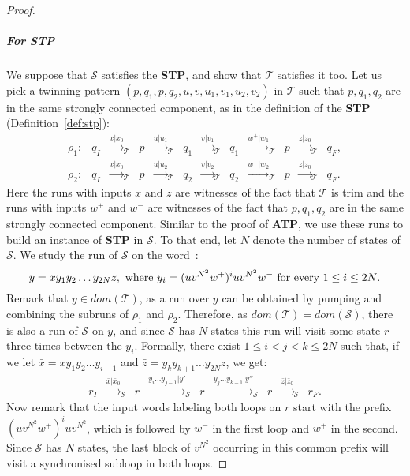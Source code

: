 \documentclass[a4paper,UKenglish,cleveref, autoref, thm-restate,authorcolumns, colorlinks]{lipics-v2021}
\newcommand\dom{\mathit{dom}}
\newcommand{\trans}{\mathcal{T}}
\newcommand{\transs}{\mathcal{S}}
\newcommand{\ATP}[0]{\textbf{ATP}}
\newcommand{\STP}[0]{\textbf{STP}}
\begin{document}
\begin{proof}
\subparagraph*{For \STP{}} 
We suppose that $\transs$ satisfies the \STP{}, and show that $\trans$ satisfies it too.
Let us pick a twinning pattern $(p,q_1,p,q_2,u,v,u_1,v_1,u_2,v_2)$
in $\trans$ such that $p,q_1,q_2$ are in the same strongly connected component,
as in the definition of the \STP{} (Definition~\ref{def:stp}):
\[
    \begin{array}{lllllllllllll}
    \rho_1: & q_I& \xrightarrow{x|x_0}_\trans &
    p & \xrightarrow{u|u_1}_\trans &
    q_1 & \xrightarrow{v|v_1}_\trans &
    q_1 &  \xrightarrow{w^+|w_1}_\trans &
    p & \xrightarrow{z|z_0}_\trans &
    q_F, \\
    \rho_2: &
    q_I & \xrightarrow{x|x_0}_\trans &
    p & \xrightarrow{u|u_2}_\trans &
    q_2 & \xrightarrow{v|v_2}_\trans &
    q_2 &  \xrightarrow{w^-|w_2}_\trans &
    p & \xrightarrow{z|z_0}_\trans &
    q_F.    
    \end{array}
\]
Here the runs with inputs $x$ and $z$ are witnesses of the fact that $\trans$ is trim
and the runs with inputs $w^+$ and $w^-$ are witnesses 
of the fact that $p,q_1,q_2$ are in the same strongly connected component.
Similar to the proof of \ATP{},
we use these runs to build an instance of \STP{} in $\transs$.
To that end, let $N$ denote the number of states of $\transs$.
We study the run of $\transs$ on the word~:
\[
    y = xy_1y_2\ldots y_{2N}z, \textup{ where $y_i = (uv^{N^2}w^+)^iuv^{N^2}w^-$ for every $1 \leq i \leq 2N$}.
\]
Remark that $y \in \dom(\trans)$,
as a run over $y$ can be obtained by pumping and combining the subruns of $\rho_1$ and $\rho_2$.
Therefore, as $\dom(\trans) = \dom(\transs)$,
there is also a run of $\transs$ on $y$,
and since $\transs$ has $N$ states
this run will visit some state $r$ three times between the $y_i$.
Formally, there exist $1 \leq i < j < k \leq 2N$ such that,
if we let $\bar{x} = xy_1y_2 \ldots y_{i-1}$ and $\bar{z} = y_{k}y_{k+1}\ldots y_{2N}z$, we get:
\[
    \begin{array}{lllllllllllllll}
    r_I & \xrightarrow{\bar{x}|\bar{x}_0}_\transs &
    r & \xrightarrow{y_{i} \ldots y_{j-1}|y'}_\transs &
    r &  \xrightarrow{y_{j} \ldots y_{k-1}|y''}_\transs &
    r &  \xrightarrow{\bar{z}|\bar{z}_0}_\transs &
    r_F.    
    \end{array}
\]
Now remark that the input words labeling both loops on $r$
start with the prefix $(uv^{N^2}w^+)^iuv^{N^2}$,
which is followed by $w^-$ in the first loop and $w^+$ in the second.
Since $\transs$ has $N$ states, the last block of $v^{N^2}$ occurring in this common
prefix will visit a synchronised subloop in both loops.

\end{proof}
\end{document}
